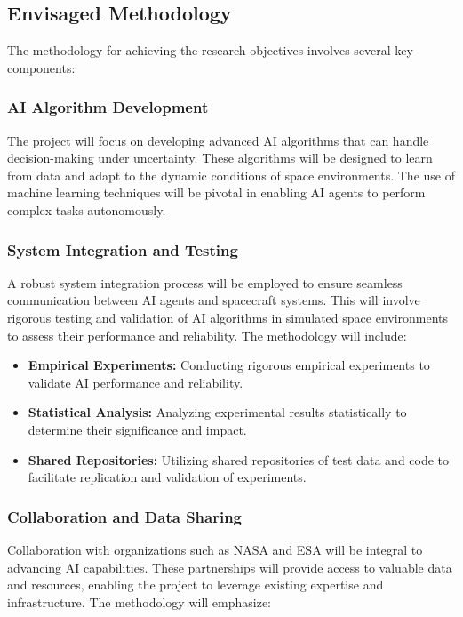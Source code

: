\documentclass[a4paper, 11pt]{article}
\begin{document}
\subsection{Envisaged Methodology}

The methodology for achieving the research objectives involves several key components:

\subsubsection{AI Algorithm Development}

The project will focus on developing advanced AI algorithms that can handle decision-making under uncertainty. These algorithms will be designed to learn from data and adapt to the dynamic conditions of space environments. The use of machine learning techniques will be pivotal in enabling AI agents to perform complex tasks autonomously.

\subsubsection{System Integration and Testing}

A robust system integration process will be employed to ensure seamless communication between AI agents and spacecraft systems. This will involve rigorous testing and validation of AI algorithms in simulated space environments to assess their performance and reliability. The methodology will include:

\begin{itemize}
    \item \textbf{Empirical Experiments:} Conducting rigorous empirical experiments to validate AI performance and reliability.
    \item \textbf{Statistical Analysis:} Analyzing experimental results statistically to determine their significance and impact.
    \item \textbf{Shared Repositories:} Utilizing shared repositories of test data and code to facilitate replication and validation of experiments.
\end{itemize}

\subsubsection{Collaboration and Data Sharing}

Collaboration with organizations such as NASA and ESA will be integral to advancing AI capabilities. These partnerships will provide access to valuable data and resources, enabling the project to leverage existing expertise and infrastructure. The methodology will emphasize:
\end{document}
